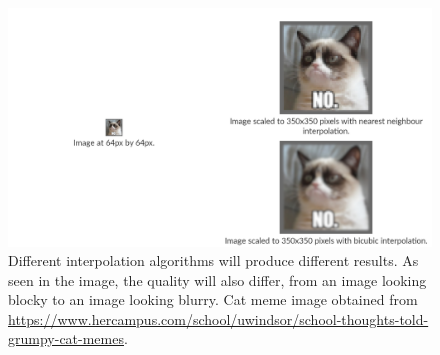 \begin{figure}[h]
	\centering
	\includegraphics[scale=1.0]{images/chap01-introduction/raster-images-scaled.png}
	\caption{Different interpolation algorithms will produce different results. As seen in the image, the quality will also differ, from an image looking blocky to an image looking blurry. Cat meme image obtained from \protect\url{https://www.hercampus.com/school/uwindsor/school-thoughts-told-grumpy-cat-memes}.}
	\label{fig:raster-images-scaled}
\end{figure}

